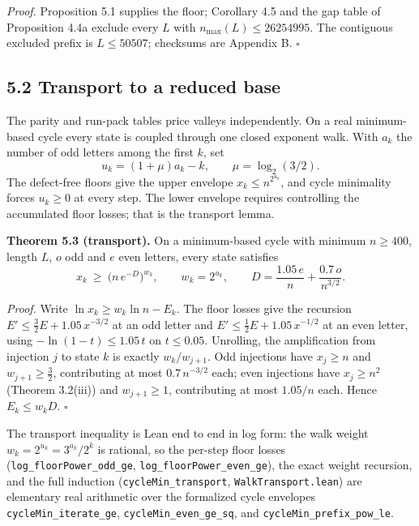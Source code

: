 \documentclass[12pt]{article}
\begin{document}
\emph{Proof.} Proposition 5.1 supplies the floor; Corollary 4.5 and the
gap table of Proposition 4.4a exclude every \(L\) with
\(n_{\max}(L)\le 26254995\). The contiguous excluded prefix is
\(L\le 50507\); checksums are Appendix B. \(\square\)

\subsection{5.2 Transport to a reduced
base}\label{transport-to-a-reduced-base}

The parity and run-pack tables price valleys independently. On a real
minimum-based cycle every state is coupled through one closed exponent
walk. With \(a_k\) the number of odd letters among the first \(k\), set
\[
u_k=(1+\mu)a_k-k,\qquad \mu=\log_2(3/2).
\] The defect-free floors give the upper envelope
\(x_k\le n^{2^{u_k}}\), and cycle minimality forces \(u_k\ge 0\) at
every step. The lower envelope requires controlling the accumulated
floor losses; that is the transport lemma.

\textbf{Theorem 5.3 (transport).} On a minimum-based cycle with minimum
\(n\ge 400\), length \(L\), \(o\) odd and \(e\) even letters, every
state satisfies \[
x_k\ \ge\ \bigl(n\,e^{-D}\bigr)^{w_k},
\qquad
w_k=2^{u_k},
\qquad
D=\frac{1.05\,e}{n}+\frac{0.7\,o}{n^{3/2}}.
\]

\emph{Proof.} Write \(\ln x_k\ge w_k\ln n-E_k\). The floor losses give
the recursion \(E'\le\tfrac32E+1.05\,x^{-3/2}\) at an odd letter and
\(E'\le\tfrac12E+1.05\,x^{-1/2}\) at an even letter, using
\(-\ln(1-t)\le 1.05\,t\) on \(t\le 0.05\). Unrolling, the amplification
from injection \(j\) to state \(k\) is exactly \(w_k/w_{j+1}\). Odd
injections have \(x_j\ge n\) and \(w_{j+1}\ge\tfrac32\), contributing at
most \(0.7\,n^{-3/2}\) each; even injections have \(x_j\ge n^2\)
(Theorem 3.2(iii)) and \(w_{j+1}\ge 1\), contributing at most \(1.05/n\)
each. Hence \(E_k\le w_k D\). \(\square\)

The transport inequality is Lean end to end in log form: the walk weight
\(w_k=2^{u_k}=3^{a_k}/2^k\) is rational, so the per-step floor losses
(\texttt{\nolinkurl{log_floorPower_odd_ge}},
\texttt{\nolinkurl{log_floorPower_even_ge}}), the exact weight
recursion, and the full induction
(\texttt{\nolinkurl{cycleMin_transport}},
\texttt{\nolinkurl{WalkTransport.lean}}) are elementary real arithmetic
over the formalized cycle envelopes
\texttt{\nolinkurl{cycleMin_iterate_ge}},
\texttt{\nolinkurl{cycleMin_even_ge_sq}}, and
\texttt{\nolinkurl{cycleMin_prefix_pow_le}}.
\end{document}
